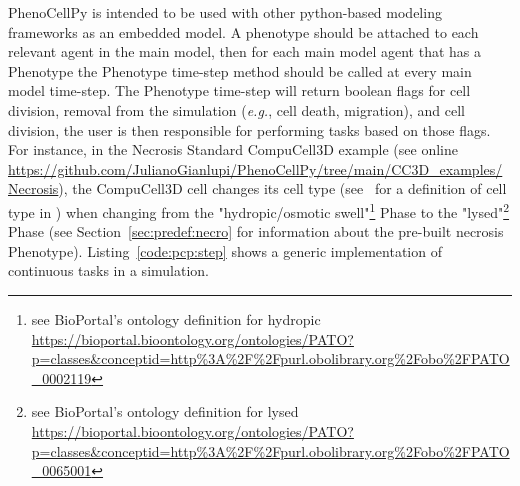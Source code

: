 


PhenoCellPy is intended to be used with other python-based modeling frameworks as an embedded model. A \pcps phenotype should be attached to each relevant agent in the main model, then for each main model agent that has a Phenotype the Phenotype time-step method should be called at every main model time-step. The Phenotype time-step will return boolean flags for cell division, removal from the simulation (\textit{e.g.}, cell death, migration), and cell division, the user is then responsible for performing tasks based on those flags. For instance, in the Necrosis Standard CompuCell3D example (see online \url{https://github.com/JulianoGianlupi/PhenoCellPy/tree/main/CC3D_examples/Necrosis}), the CompuCell3D cell changes its cell type (see~\cite{swat_multi-scale_2012} for a definition of cell type in \ccd) when changing from the "hydropic/osmotic swell"\footnote{see BioPortal's ontology definition for hydropic \url{https://bioportal.bioontology.org/ontologies/PATO?p=classes&conceptid=http\%3A\%2F\%2Fpurl.obolibrary.org\%2Fobo\%2FPATO_0002119}} Phase to the "lysed"\footnote{see BioPortal's ontology definition for lysed \url{https://bioportal.bioontology.org/ontologies/PATO?p=classes&conceptid=http\%3A\%2F\%2Fpurl.obolibrary.org\%2Fobo\%2FPATO_0065001}} Phase (see Section~\ref{sec:predef:necro} for information about the pre-built necrosis Phenotype). Listing~\ref{code:pcp:step} shows a generic implementation of continuous \pcps tasks in a \ccds simulation.

